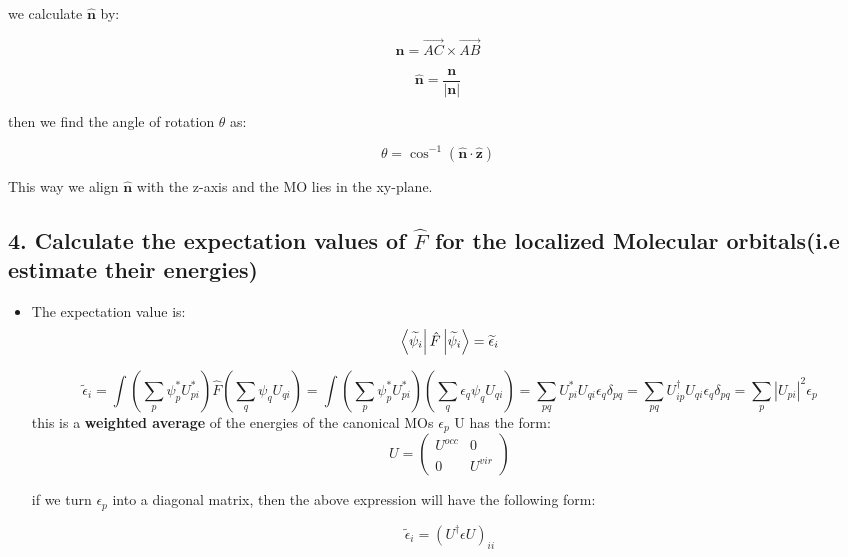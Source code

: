 \documentclass{article}
\begin{document}
\begin{itemize}
\begin{center}
\begin{tikzpicture}[tdplot_main_coords, scale=1.2]
\end{tikzpicture}
\end{center}

we calculate $\mathbf{\hat{n}}$ by:

\[
\mathbf{n} = \vec{AC} \times \vec{AB}
\]

\[
\mathbf{\hat{n}} = \frac{\mathbf{n}}{|{\mathbf{n}}|}
\]

then we find the angle of rotation $\theta$ as:

\[
\theta = \cos^{-1}\left({ \mathbf{\hat{n}} \cdot \hat{\mathbf{z}} }\right)
\]

This way we align $\mathbf{\hat{n}}$ with the z-axis and the MO lies in the xy-plane.

\end{itemize}

\subsection*{4. Calculate the expectation values of \(\hat{F}\) for the localized Molecular orbitals(i.e estimate their energies)}

\begin{itemize}
    \item The expectation value is: 
    \[
    \bra{\widetilde{\psi}_i}\hat{F}\ket{\widetilde{\psi}_i} = \widetilde{\epsilon}_i
    \]

    \[
    \widetilde{\epsilon}_i = \int (\sum_{p} \psi_{p}^{*} U_{pi}^{*}) \hat{F}(\sum_{q} \psi_{q} U_{qi}) =
    \int (\sum_{p} \psi_{p}^{*} U_{pi}^{*})(\sum_{q} \epsilon_q \psi_{q} U_{qi}) =
    \sum_{pq} U_{pi}^{*}U_{qi}\epsilon_{q}\delta_{pq} = \sum_{pq} U_{ip}^{\dagger}U_{qi}\epsilon_{q}\delta_{pq} = \sum_{p} |U_{pi}|^{2}\epsilon_{p}
    \]
    this is a \textbf{weighted average} of the energies of the canonical MOs $\epsilon_p$
    U has the form:
    \[ U =  
    \begin{pmatrix}
    U^{occ} & 0 \\
    0 & U^{vir}
    \end{pmatrix}   
    \]

    if we turn $\epsilon_p$ into a diagonal matrix, then the above expression will have the following form:

    \[
    \widetilde{\epsilon}_i = (U^{\dagger}\epsilon U)_{ii}
    \]

\end{itemize}
\end{document}
